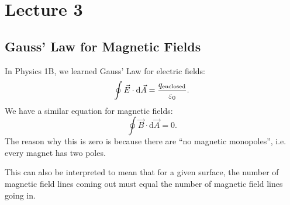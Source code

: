 \documentclass[class=article, crop=false]{standalone}
\begin{document}
  \section{Lecture 3}
  \subsection{Gauss' Law for Magnetic Fields}
  In Physics 1B, we learned Gauss' Law for electric fields:
  \[
    \oint \vec{E}\cdot \mathrm{d}\vec{A} = \frac{q_{\text{enclosed}}}{\varepsilon_0}.
  \]
  We have a similar equation for magnetic fields:
  \[
    \oint \vec{B}\cdot \mathrm{d}\vec{A} = 0.
  \]
  The reason why this is zero is because there are ``no magnetic monopoles'', i.e. every magnet has two poles. 
  \begin{note}{}
    This can also be interpreted to mean that for a given surface, the number of magnetic field lines coming out must equal the number of magnetic field lines going in.
  \end{note}
\end{document}
